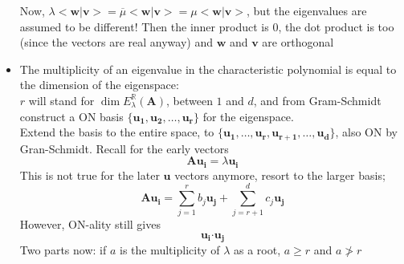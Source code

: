 \documentclass[10pt, oneside]{article}
\let\geq\geqslant
\newcommand{\R}{\mathbb{R}}
\newcommand{\Cdot}{\boldsymbol{\cdot}}
\renewcommand{\vec}[1]{\mathbf{#1}}
\newcommand{\mat}[1]{\mathbf{#1}}
\begin{document}
\begin{itemize}
        Now, $\lambda <\vec{w}|\vec{v}> = \overline{\mu} <\vec{w}|\vec{v}> = \mu <\vec{w}|\vec{v}>$, but the eigenvalues are assumed to be different! Then the inner product is $0$, the dot product is too (since the vectors are real anyway) and $\vec{w}$ and $\vec{v}$ are orthogonal
    \item The multiplicity of an eigenvalue in the characteristic polynomial is equal to the dimension of the eigenspace:\\
        $r$ will stand for $\dim E_\lambda^\R(\mat{A})$, between $1$ and $d$, and from Gram-Schmidt construct a ON basis $\{\vec{u_1}, \vec{u_2}, \hdots, \vec{u_r}\}$ for the eigenspace.\\
        Extend the basis to the entire space, to $\{\vec{u_1}, \hdots, \vec{u_r}, \vec{u_{r+1}}, \hdots, \vec{u_d}\}$, also ON by Gran-Schmidt. Recall for the early vectors
            \[\mat{A} \vec{u_i} = \lambda \vec{u_i}\]
        This is not true for the later $\vec{u}$ vectors anymore, resort to the larger basis;
            \[\mat{A} \vec{u_i} = \sum_{j=1}^r b_j \vec{u_j} + \sum_{j=r+1}^d c_j \vec{u_j}\]
        However, ON-ality still gives
            \[\vec{u_i} \Cdot \vec{u_j}\]
        Two parts now:  if $a$ is the multiplicity of $\lambda$ as a root, $a \geq r$ and $a \ngtr r$
\end{itemize}
\end{document}
